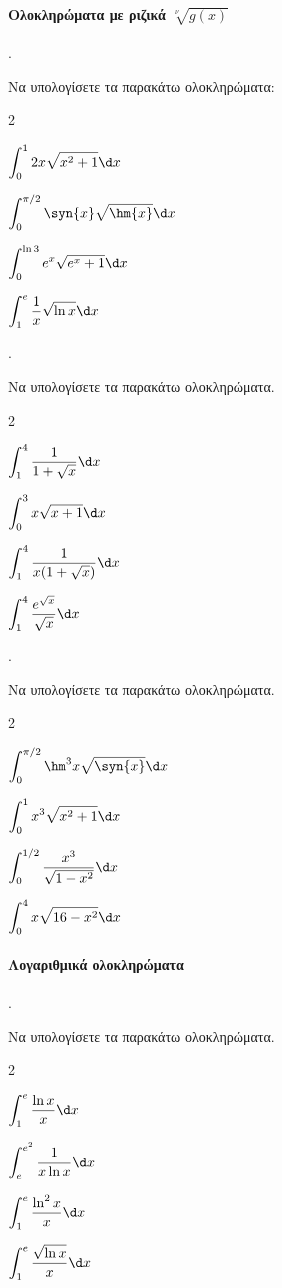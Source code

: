 \documentclass[11pt,a4paper,twocolumn]{article}
\newcounter{askhsh}
\newcommand{\askhsh}{\large\theaskhsh.\ \addtocounter{askhsh}{1}}
\begin{document}
\paragraph{Ολοκληρώματα με ριζικά $\sqrt[\nu]{g(x)}$}
\askhsh Να υπολογίσετε τα παρακάτω ολοκληρώματα:
\begin{multicols}{2}
\begin{alist}
\item $\displaystyle\int_{0}^{1} 2x\sqrt{x^2+1} \d x$
\item $\displaystyle\int_{0}^{\pi/2} \syn{x} \sqrt{\hm{x}} \d x$
\item $\displaystyle\int_{0}^{\ln 3} e^x \sqrt{e^x+1} \d x$
\item $\displaystyle\int_{1}^{e} \dfrac{1}{x}\sqrt{\ln x} \d x$
\end{alist}
\end{multicols}

\askhsh Να υπολογίσετε τα παρακάτω ολοκληρώματα.
\begin{multicols}{2}
\begin{alist}
\item $\displaystyle\int_{1}^{4} \dfrac{1}{1+\sqrt{x}} \d x$
\item $\displaystyle\int_{0}^{3} x\sqrt{x+1} \d x$
\item $\displaystyle\int_{1}^{4} \dfrac{1}{x(1+\sqrt{x})} \d x$
\item $\displaystyle\int_{1}^{4} \dfrac{e^{\sqrt{x}}}{\sqrt{x}} \d x$
\end{alist}
\end{multicols}

\askhsh Να υπολογίσετε τα παρακάτω ολοκληρώματα.
\begin{multicols}{2}
\begin{alist}
\item $\displaystyle\int_{0}^{\pi/2} \hm^3{x} \sqrt{\syn{x}} \d x$
\item $\displaystyle\int_{0}^{1} x^3 \sqrt{x^2+1} \d x$
\item $\displaystyle\int_{0}^{1/2} \dfrac{x^3}{\sqrt{1-x^2}} \d x$
\item $\displaystyle\int_{0}^{4} x \sqrt{16-x^2} \d x$
\end{alist}
\end{multicols}

\paragraph{Λογαριθμικά ολοκληρώματα}
\askhsh Να υπολογίσετε τα παρακάτω ολοκληρώματα.
\begin{multicols}{2}
\begin{alist}
\item $\displaystyle\int_{1}^{e} \dfrac{\ln x}{x} \d x$
\item $\displaystyle\int_{e}^{e^2} \dfrac{1}{x \ln x} \d x$
\item $\displaystyle\int_{1}^{e} \dfrac{\ln^2 x}{x} \d x$
\item $\displaystyle\int_{1}^{e} \dfrac{\sqrt{\ln x}}{x} \d x$
\end{alist}
\end{multicols}
\end{document}
